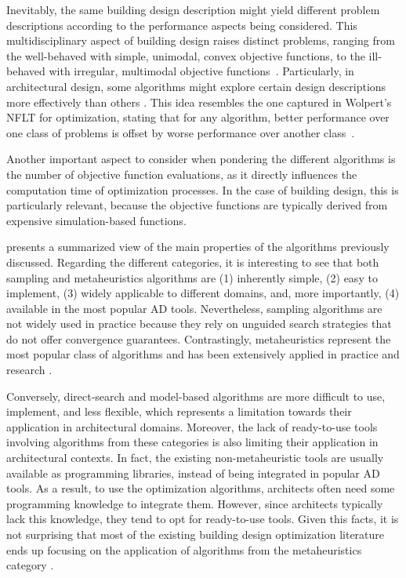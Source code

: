 	Inevitably, the same building design description might yield different problem descriptions according to the performance aspects being considered. This multidisciplinary aspect of building design raises distinct problems, ranging from the well-behaved with simple, unimodal, convex objective functions, to the ill-behaved with irregular, multimodal objective functions~\cite{Wortmann2017ADO}. Particularly, in architectural design, some algorithms might explore certain design descriptions more effectively than others%
	\cite{Wortmann2017GABESTCHOICE, Fang2017}. This idea resembles the one captured in Wolpert's \ac{NFLT} for optimization, stating that for any algorithm, better performance over one class of problems is offset by worse performance over another class~\cite{Wolpert1997NFLT}. 
	
	Another important aspect to consider when pondering the different algorithms is the number of objective function evaluations, as it directly influences the computation time of optimization processes. In the case of building design, this is particularly relevant, because the objective functions are typically derived from expensive simulation-based functions.
		
	 presents a summarized view of the main properties of the algorithms previously discussed. Regarding the different categories, it is interesting to see that both sampling and metaheuristics algorithms are (1) inherently simple, (2) easy to implement, (3) widely applicable to different domains, and, more importantly, (4) available in the most popular \ac{AD} tools. Nevertheless, sampling algorithms are not widely used in practice because they rely on unguided search strategies that do not offer convergence guarantees. Contrastingly, metaheuristics represent the most popular class of algorithms and has been extensively applied in practice and research \cite{Wortmann2017ADO}. 
	
	Conversely, direct-search and model-based algorithms are more difficult to use, implement, and less flexible, which represents a limitation towards their application in architectural domains. Moreover, the lack of ready-to-use tools involving algorithms from these categories is also limiting their application in architectural contexts. In fact, the existing non-metaheuristic tools are usually available as programming libraries, instead of being integrated in popular \ac{AD} tools. As a result, to use the optimization algorithms, architects often need some programming knowledge to integrate them. However, since architects typically lack this knowledge, they tend to opt for ready-to-use tools. Given this facts, it is not surprising that most of the existing building design optimization literature ends up focusing on the application of algorithms from the metaheuristics category \cite{Evins2013,Nguyen2014,Hamdy2016}. 
	
